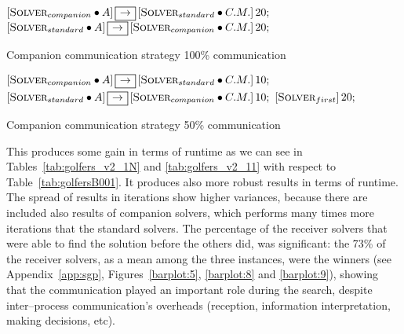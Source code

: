 \begin{algorithm}[h]
\dontprintsemicolon
\SetNoline
$\left[\eqsolverposl{companion}\posldot A\right] \onetoone \left[\eqsolverposl{standard}\posldot C.M.\right]20;$\;
$\left[\eqsolverposl{standard}\posldot A\right] \onetoone \left[\eqsolverposl{companion}\posldot C.M.\right]20;$
\caption{Companion communication strategy 100\% communication}\label{comm:golfers_v2_100}
\end{algorithm}

\begin{algorithm}[h]
\dontprintsemicolon
\SetNoline
$\left[\eqsolverposl{companion}\posldot A\right] \onetoone \left[\eqsolverposl{standard}\posldot C.M.\right]10;$\;
$\left[\eqsolverposl{standard}\posldot A\right] \onetoone \left[\eqsolverposl{companion}\posldot C.M.\right]10;$\;
$\left[\textbf{{\sc Solver}}_{first}\right]20;$\;
\caption{Companion communication strategy 50\% communication}\label{comm:golfers_v2_50}
\end{algorithm}

This \commstr{} produces some gain in terms of runtime as we can see in Tables~\ref{tab:golfers_v2_1N} and \ref{tab:golfers_v2_11} with respect to Table~\ref{tab:golfersB001}. It produces also more robust results in terms of runtime. The spread of results in iterations show higher variances, because there are included also results of companion solvers, which performs many times more iterations that the standard solvers. The percentage of the receiver solvers that were able to find the solution before the others did, was significant: the 73\% of the receiver solvers, as a mean among the three instances, were the winners (see Appendix~\ref{app:sgp}, Figures~\ref{barplot:5}, \ref{barplot:8} and \ref{barplot:9}), showing that the communication played an important role during the search, despite inter--process communication's overheads (reception, information interpretation, making decisions, etc).

\begin{table}
\captionsetup{belowskip=6pt,aboveskip=6pt}
\centering 
\renewcommand{\arraystretch}{1}
\caption{Companion \commstr{} with communication \oneTn}
\label{tab:golfers_v2_1N}
\end{table}

